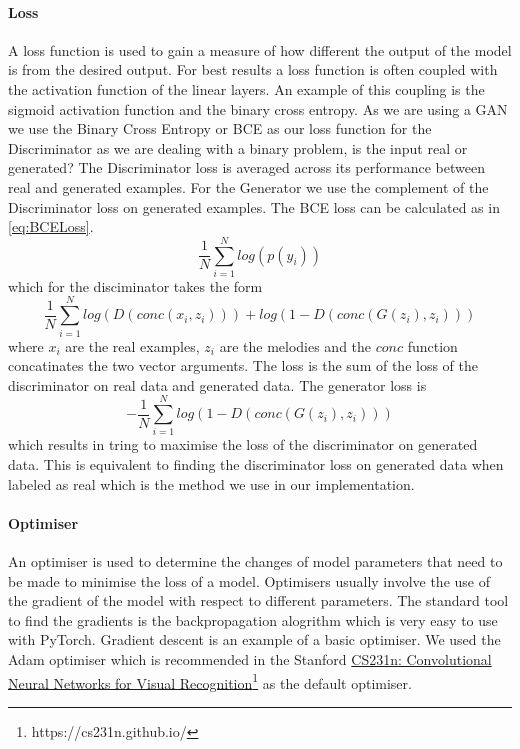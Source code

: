 \paragraph{Loss}
A loss function is used to gain a measure of how different the output of the model is from the desired output.
For best results a loss function is often coupled with the activation function of the linear layers.
An example of this coupling is the sigmoid activation function and the binary cross entropy. %
As we are using a GAN we use the Binary Cross Entropy or BCE as our loss function for the Discriminator as we are dealing with a binary problem, is the input real or generated?
The Discriminator loss is averaged across its performance between real and generated examples.
For the Generator we use the complement of the Discriminator loss on generated examples.
The BCE loss can be calculated as in \ref{eq:BCELoss}.
\begin{equation}
    \label{eq:BCELoss}
    \frac{1}{N} \sum_{i=1}^N log(p(y_i))
\end{equation}
    which for the disciminator takes the form
\begin{equation}
    \frac{1}{N} \sum_{i=1}^N log(D(conc(x_i,z_i))) + log(1-D(conc(G(z_i),z_i)))
\end{equation}
    where $x_i$ are the real examples, $z_i$ are the melodies and the $conc$ function concatinates the two vector arguments.
    The loss is the sum of the loss of the discriminator on real data and generated data.
    The generator loss is
\begin{equation}
    -\frac{1}{N} \sum_{i=1}^N log(1-D(conc(G(z_i),z_i)))
\end{equation}
    which results in tring to maximise the loss of the discriminator on generated data.
    This is equivalent to finding the discriminator loss on generated data when labeled as real which is the method we use in our implementation.

    
\paragraph{Optimiser}
An optimiser is used to determine the changes of model parameters that need to be made to minimise the loss of a model.
Optimisers usually involve the use of the gradient of the model with respect to different parameters.
The standard tool to find the gradients is the backpropagation alogrithm %
which is very easy to use with PyTorch.
Gradient descent is an example of a basic optimiser.
We used the Adam optimiser \cite{Adam} which is recommended in the Stanford \href{https://cs231n.github.io/}{CS231n: Convolutional Neural Networks for Visual Recognition}\footnote{https://cs231n.github.io/} as the default optimiser.




